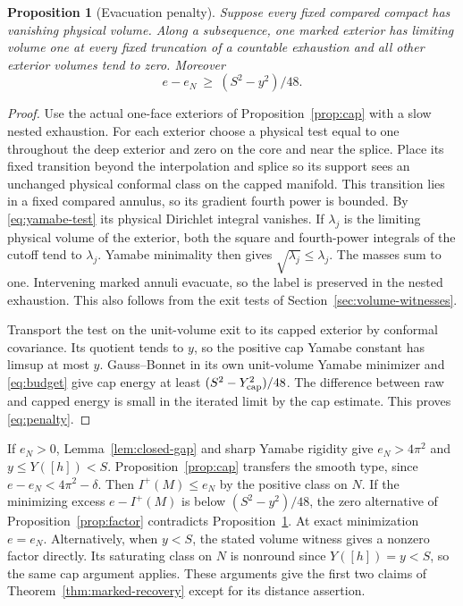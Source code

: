 \documentclass[11pt]{article}
\newtheorem{proposition}[theorem]{Proposition}
\theoremstyle{definition}
\theoremstyle{remark}
\begin{document}
\begin{proposition}[Evacuation penalty]\label{prop:evacuation}
Suppose every fixed compared compact has vanishing physical volume. Along a subsequence, one marked exterior has limiting volume one at every fixed truncation of a countable exhaustion and all other exterior volumes tend to zero. Moreover
\begin{equation}\label{eq:penalty}
 e-e_N\ \ge\ (S^2-y^2)/48 .
\end{equation}
\end{proposition}
\begin{proof}
Use the actual one-face exteriors of Proposition~\ref{prop:cap} with a slow nested exhaustion. For each exterior choose a physical test equal to one throughout the deep exterior and zero on the core and near the splice. Place its fixed transition beyond the interpolation and splice so its support sees an unchanged physical conformal class on the capped manifold. This transition lies in a fixed compared annulus, so its gradient fourth power is bounded. By \eqref{eq:yamabe-test} its physical Dirichlet integral vanishes. If \(\lambda_j\) is the limiting physical volume of the exterior, both the square and fourth-power integrals of the cutoff tend to \(\lambda_j\). Yamabe minimality then gives \(\sqrt{\lambda_j}\le\lambda_j\). The masses sum to one. Intervening marked annuli evacuate, so the label is preserved in the nested exhaustion. This also follows from the exit tests of Section~\ref{sec:volume-witnesses}.

Transport the test on the unit-volume exit to its capped exterior by conformal covariance. Its quotient tends to \(y\), so the positive cap Yamabe constant has limsup at most \(y\). Gauss--Bonnet in its own unit-volume Yamabe minimizer and \eqref{eq:budget} give cap energy at least \((S^2-Y_{\rm cap}^2)/48\). The difference between raw and capped energy is small in the iterated limit by the cap estimate. This proves \eqref{eq:penalty}.
\end{proof}

If \(e_N>0\), Lemma~\ref{lem:closed-gap} and sharp Yamabe rigidity give \(e_N>4\pi^2\) and \(y\le Y([h])<S\). Proposition~\ref{prop:cap} transfers the smooth type, since \(e-e_N<4\pi^2-\delta\). Then \(I^+(M)\le e_N\) by the positive class on \(N\). If the minimizing excess \(e-I^+(M)\) is below \((S^2-y^2)/48\), the zero alternative of Proposition~\ref{prop:factor} contradicts Proposition~\ref{prop:evacuation}. At exact minimization \(e=e_N\). Alternatively, when \(y<S\), the stated volume witness gives a nonzero factor directly. Its saturating class on \(N\) is nonround since \(Y([h])=y<S\), so the same cap argument applies. These arguments give the first two claims of Theorem~\ref{thm:marked-recovery} except for its distance assertion.
\end{document}
